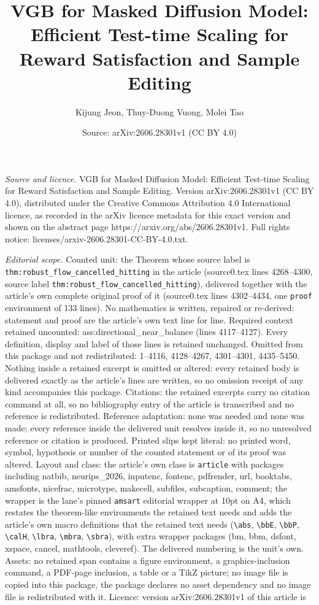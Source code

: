 \documentclass[10pt,a4paper]{amsart}
\title[VGB for Masked Diffusion Model: Efficient Test-time Scaling ]{VGB for Masked Diffusion Model: Efficient Test-time Scaling for Reward Satisfaction and Sample Editing}
\author{Kijung Jeon, Thuy-Duong Vuong, Molei Tao}
\date{Source: arXiv:2606.28301v1 (CC BY 4.0)}
\begin{document}
\maketitle

\noindent\emph{Source and licence.} VGB for Masked Diffusion Model: Efficient Test-time Scaling for Reward Satisfaction and Sample Editing. Version arXiv:2606.28301v1 (CC BY 4.0), distributed under the Creative Commons Attribution 4.0 International licence, as recorded in the arXiv licence metadata for this exact version and shown on the abstract page https://arxiv.org/abs/2606.28301v1. Full rights notice: licenses/arxiv-2606.28301-CC-BY-4.0.txt.\par\smallskip

\noindent\textit{Editorial scope.} Counted unit: the Theorem whose source label is \texttt{thm:robust\_flow\_cancelled\_hitting} in the article (source0.tex lines 4268--4300, source label \texttt{thm:robust\_flow\_cancelled\_hitting}), delivered together with the article's own complete original proof of it (source0.tex lines 4302--4434, one \texttt{proof} environment of 133 lines). No mathematics is written, repaired or re-derived: statement and proof are the article's own text line for line. Required context retained uncounted: ass:directional\_near\_balance (lines 4117--4127). Every definition, display and label of those lines is retained unchanged. Omitted from this package and not redistributed: 1--4116, 4128--4267, 4301--4301, 4435--5450. Nothing inside a retained excerpt is omitted or altered: every retained body is delivered exactly as the article's lines are written, so no omission receipt of any kind accompanies this package. Citations: the retained excerpts carry no citation command at all, so no bibliography entry of the article is transcribed and no reference is redistributed. Reference adaptation: none was needed and none was made; every reference inside the delivered unit resolves inside it, so no unresolved reference or citation is produced. Printed slips kept literal: no printed word, symbol, hypothesis or number of the counted statement or of its proof was altered. Layout and class: the article's own class is \texttt{article} with packages including natbib, neurips\_2026, inputenc, fontenc, pdfrender, url, booktabs, amsfonts, nicefrac, microtype, makecell, subfiles, subcaption, comment; the wrapper is the lane's pinned \texttt{amsart} editorial wrapper at 10pt on A4, which restates the theorem-like environments the retained text needs and adds the article's own macro definitions that the retained text needs (\texttt{\textbackslash abs}, \texttt{\textbackslash bbE}, \texttt{\textbackslash bbP}, \texttt{\textbackslash calH}, \texttt{\textbackslash lbra}, \texttt{\textbackslash mbra}, \texttt{\textbackslash sbra}), with extra wrapper packages (bm, bbm, dsfont, xspace, cancel, mathtools, cleveref). The delivered numbering is the unit's own. Assets: no retained span contains a figure environment, a graphics-inclusion command, a PDF-page inclusion, a table or a TikZ picture; no image file is copied into this package, the package declares no asset dependency and no image file is redistributed with it. Licence: version arXiv:2606.28301v1 of this article is 
\end{document}

